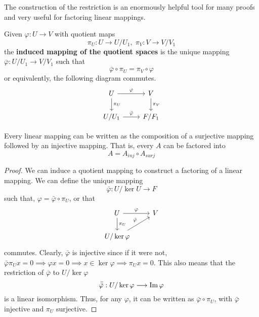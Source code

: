   The construction of the restriction is an enormously helpful tool for many proofs and very useful for factoring linear mappings. 

  \begin{definition}
    Given $\varphi: U \longrightarrow V$ with quotient maps 
    \begin{equation}
      \pi_U: U \longrightarrow U / U_1, \; \pi_V: V \longrightarrow V / V_1
    \end{equation}
    the \textbf{induced mapping of the quotient spaces} is the unique mapping $\bar{\varphi}: U/U_1 \longrightarrow V / V_1$ such that 
    \begin{equation}
      \bar{\varphi} \circ \pi_U = \pi_V \circ \varphi
    \end{equation}
    or equivalently, the following diagram commutes. 
    \[\begin{tikzcd}
        U \arrow{r}{\varphi} \arrow{d}{\pi_U} & V \arrow{d}{\pi_V}\\
        U / U_1 \arrow{r}{\bar{\varphi}} & F / F_1
    \end{tikzcd}\]
  \end{definition} 

  \begin{theorem}
    Every linear mapping can be written as the composition of a surjective mapping followed by an injective mapping. That is, every $A$ can be factored into 
    \begin{equation}
      A = A_{inj} \circ A_{surj}
    \end{equation}
  \end{theorem}
  \begin{proof}
    We can induce a quotient mapping to construct a factoring of a linear mapping. We can define the unique mapping 
    \begin{equation}
      \bar{\varphi}: U / \ker{U} \longrightarrow F
    \end{equation}
    such that, $\varphi = \bar{\varphi} \circ \pi_U$, or that 
    \[\begin{tikzcd}
       U \arrow{r}{\varphi} \arrow{d}{\pi_U} & V \\
       U / \ker{\varphi} \arrow{ru}{\bar{\varphi}}
    \end{tikzcd} \]
    commutes. Clearly, $\bar{\varphi}$ is injective since if it were not, $\bar{\varphi} \pi_U x = 0 \implies \varphi x = 0 \implies x \in \ker{\varphi} \implies \pi_U x = 0$. This also means that the restriction of $\bar{\varphi}$ to $U / \ker{\varphi}$
    \begin{equation}
      \bar{\bar{\varphi}}: U / \ker{\varphi} \longrightarrow \im{\varphi}
    \end{equation}
    is a linear isomorphism. Thus, for any $\varphi$, it can be written as $\bar{\varphi} \circ \pi_U$, with $\bar{\varphi}$ injective and $\pi_U$ surjective. 
  \end{proof}

